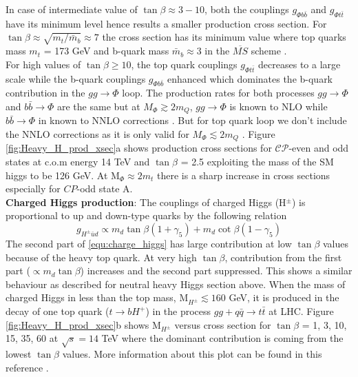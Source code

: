 In case of intermediate value of $\tan\beta \approx 3-10$, both the couplings $g_{\Phi b\bar{b}}$ and $g_{\Phi t\bar{t}}$ have its minimum level hence results a smaller production cross section. For $\tan\beta \approx \sqrt{m_{t}/\bar{m}_{b}} \approx 7$ the cross section has its minimum value where top quarks mass $m_{t}$ = 173 GeV and b-quark mass $\bar{m}_{b}\approx 3$ in the $\overline{MS}$ scheme \cite{Baglio:2015wcg}. \\
For high values of $\tan\beta \geq 10$, the top quark couplings $g_{\Phi t\bar{t}}$ decreases to a large scale while the b-quark couplings $g_{\Phi b\bar{b}}$ enhanced which dominates the b-quark contribution in the $gg\rightarrow \Phi$ loop. The production rates for both processes $gg\rightarrow \Phi$ and $b\bar{b}\rightarrow \Phi$ are the same but at $M_{\Phi} \gtrsim 2m_{Q}$, $gg\rightarrow \Phi$ is known to NLO while $b\bar{b}\rightarrow \Phi$ in known to NNLO corrections \cite{Harlander:2003ai}. But for top quark loop we don't include the NNLO corrections as it is only valid for $M_{\Phi} \lesssim 2m_{Q}$ \cite{Dittmaier:2011ti}. Figure \ref{fig:Heavy_H_prod_xsec}a shows production cross sections for $\mathcal{CP}$-even and odd states at c.o.m energy 14 TeV and $\tan\beta$ = 2.5 exploiting the mass of the SM higgs to be 126 GeV. At M$_{\Phi} \approx 2m_{t}$ there is a sharp increase in cross sections especially for $CP$-odd state A.     
\\
\textbf{Charged Higgs production}:
The couplings of charged Higgs (H$^{\pm}$) is proportional to up and down-type quarks by the following relation
\begin{equation}\label{equ:charge_higgs}
g_{H^{\pm}\bar{u}d} \propto m_{d}\tan\beta\left(1+\gamma_{5}\right) + m_{d}\cot\beta\left(1-\gamma_{5}\right)
\end{equation} 
The second part of \ref{equ:charge_higgs} has large contribution at low $\tan\beta$ values because of the heavy top quark. At very high $\tan\beta$, contribution from the first part ($\propto m_{d}\tan\beta$) increases and the second part suppressed. This shows a similar behaviour as described for neutral heavy Higgs section above. When the mass of charged Higgs in less than the top mass, M$_{H^{\pm}} \lesssim 160$ GeV, it is produced in the decay of one top quark ($t\rightarrow bH^{+}$) in the process $gg + q\bar{q}\rightarrow t\bar{t}$ at LHC. Figure \ref{fig:Heavy_H_prod_xsec}b shows M$_{H^{\pm}}$ versus cross section for $\tan\beta$ = 1, 3, 10, 15, 35, 60 at $\sqrt{s} = 14$ TeV where the dominant contribution is coming from the lowest $\tan\beta$ values. More information about this plot can be found in this reference \cite{Djouadi:2015jea}.

